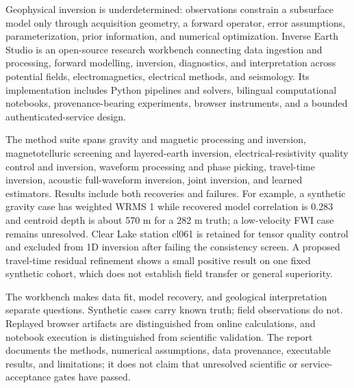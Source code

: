 Geophysical inversion is underdetermined: observations constrain a
subsurface model only through acquisition geometry, a forward operator,
error assumptions, parameterization, prior information, and numerical
optimization. Inverse Earth Studio is an open-source research workbench
connecting data ingestion and processing, forward modelling, inversion,
diagnostics, and interpretation across potential fields,
electromagnetics, electrical methods, and seismology. Its implementation
includes Python pipelines and solvers, bilingual computational
notebooks, provenance-bearing experiments, browser instruments, and a
bounded authenticated-service design.

The method suite spans gravity and magnetic processing and inversion,
magnetotelluric screening and layered-earth inversion,
electrical-resistivity quality control and inversion, waveform
processing and phase picking, travel-time inversion, acoustic
full-waveform inversion, joint inversion, and learned estimators.
Results include both recoveries and failures. For example, a synthetic
gravity case has weighted WRMS 1 while recovered model correlation is
0.283 and centroid depth is about 570 m for a 282 m truth; a
low-velocity FWI case remains unresolved. Clear Lake station cl061 is
retained for tensor quality control and excluded from 1D inversion after
failing the consistency screen. A proposed travel-time residual
refinement shows a small positive result on one fixed synthetic cohort,
which does not establish field transfer or general superiority.

The workbench makes data fit, model recovery, and geological
interpretation separate questions. Synthetic cases carry known truth;
field observations do not. Replayed browser artifacts are distinguished
from online calculations, and notebook execution is distinguished from
scientific validation. The report documents the methods, numerical
assumptions, data provenance, executable results, and limitations; it
does not claim that unresolved scientific or service-acceptance gates
have passed.
